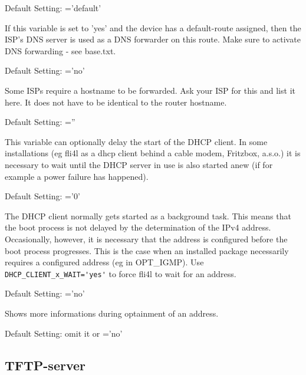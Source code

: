 \begin{description}
Default Setting: ='default'


If this variable is set to 'yes' and the device has a default-route assigned,
then the ISP's DNS server is used as a DNS forwarder on this route.
Make sure to activate DNS forwarding - see base.txt.

Default Setting: ='no'

Some ISPs require a hostname to be forwarded. Ask your ISP for this and list it here.
It does not have to be identical to the router hostname.

Default Setting: =''


This variable can optionally delay the start of the DHCP client. In some
installations (eg fli4l as a dhcp client behind a cable modem, Fritzbox, a.s.o.)
it is necessary to wait until the DHCP server in use is also started
anew (if for example a power failure has happened).

Default Setting: ='0'


The DHCP client normally gets started as a background task. This means that
the boot process is not delayed by the determination of the IPv4 address.
Occasionally, however, it is necessary that the address is configured
before the boot process progresses. This is the case when an installed package
necessarily requires a configured address (eg in OPT\_IGMP). Use
\verb+DHCP_CLIENT_x_WAIT='yes'+ to force fli4l to wait for an address.

Default Setting: ='no'

Shows more informations during optainment of an address.

Default Setting: omit it or ='no'
\end{description}

\subsection {TFTP-server}

